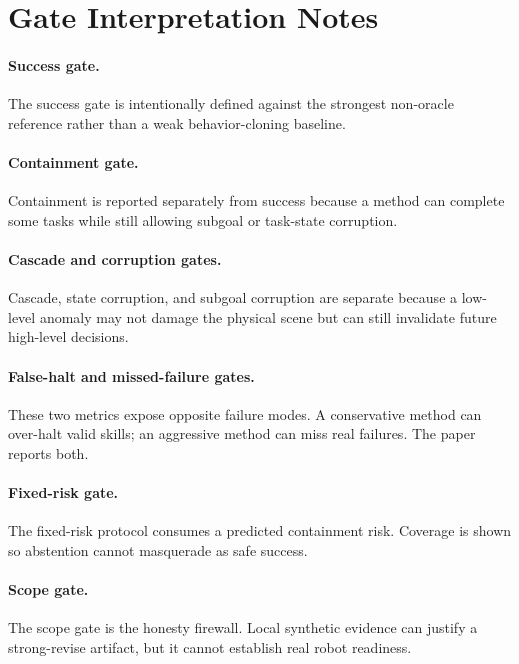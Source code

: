 \documentclass{article}
\begin{document}
\section{Gate Interpretation Notes}
\paragraph{Success gate.}
The success gate is intentionally defined against the strongest non-oracle reference rather than a weak behavior-cloning baseline.

\paragraph{Containment gate.}
Containment is reported separately from success because a method can complete some tasks while still allowing subgoal or task-state corruption.

\paragraph{Cascade and corruption gates.}
Cascade, state corruption, and subgoal corruption are separate because a low-level anomaly may not damage the physical scene but can still invalidate future high-level decisions.

\paragraph{False-halt and missed-failure gates.}
These two metrics expose opposite failure modes. A conservative method can over-halt valid skills; an aggressive method can miss real failures. The paper reports both.

\paragraph{Fixed-risk gate.}
The fixed-risk protocol consumes a predicted containment risk. Coverage is shown so abstention cannot masquerade as safe success.

\paragraph{Scope gate.}
The scope gate is the honesty firewall. Local synthetic evidence can justify a strong-revise artifact, but it cannot establish real robot readiness.



\end{document}
